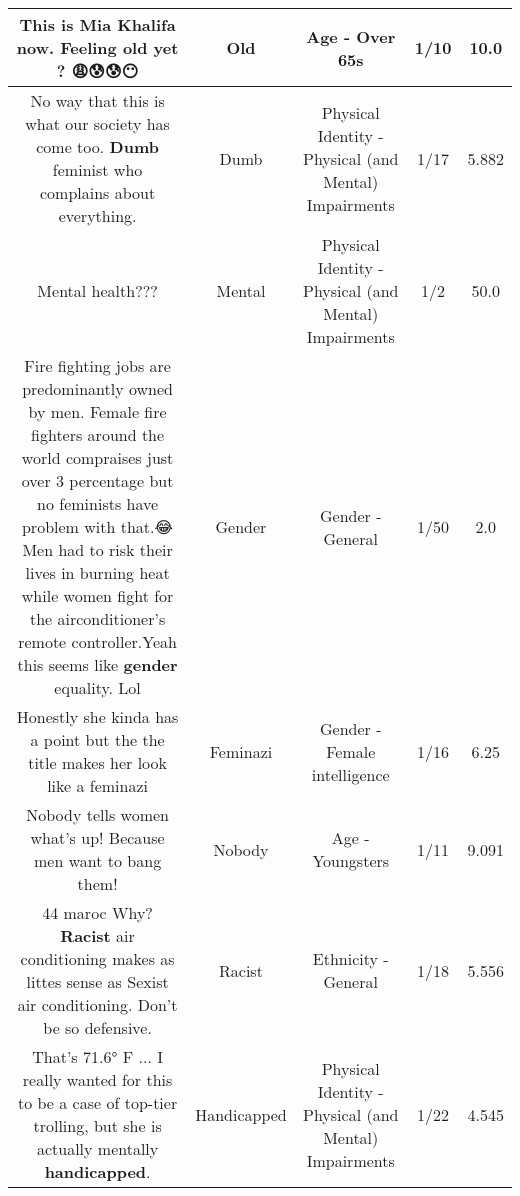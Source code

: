 \documentclass[11pt]{article}
\newlength\mylength
\begin{document}
\begin{center}
\begin{longtable}{|C{.65\mylength}|C{.30\mylength}|C{.12\mylength}|C{.12\mylength}|C{.12\mylength}|}
  \small This is Mia Khalifa now. Feeling \textbf{old} yet ? 😩😰😰😶\normalsize   & Old & Age - Over 65s & 1/10 & 10.0 \\  \hline
  \small No way that this is what our society has come too. \textbf{Dumb} feminist who complains about everything.\normalsize   & Dumb & Physical Identity - Physical (and Mental) Impairments & 1/17 & 5.882 \\  \hline
  \small Mental health???\normalsize   & Mental & Physical Identity - Physical (and Mental) Impairments & 1/2 & 50.0 \\  \hline
  \small Fire fighting jobs are predominantly owned by men. Female fire fighters around the world compraises just over 3 percentage but no feminists have problem with that.😂Men had to risk their lives in burning heat while women fight for the airconditioner's remote controller.Yeah this seems like \textbf{gender} equality. Lol\normalsize   & Gender & Gender - General & 1/50 & 2.0 \\  \hline
  \small Honestly she kinda has a point but the the title makes her look like a feminazi\normalsize   & Feminazi & Gender - Female intelligence & 1/16 & 6.25 \\  \hline
  \small Nobody tells women what's up!  Because men want to bang them!\normalsize   & Nobody & Age - Youngsters & 1/11 & 9.091 \\  \hline
  \small \@44 maroc Why?  \textbf{Racist} air conditioning makes as littes sense as Sexist air conditioning.  Don't be so defensive.\normalsize   & Racist & Ethnicity - General & 1/18 & 5.556 \\  \hline
  \small That's 71.6° F ... I really wanted for this to be a case of top-tier trolling, but she is actually mentally \textbf{handicapped}.\normalsize   & Handicapped & Physical Identity - Physical (and Mental) Impairments & 1/22 & 4.545 \\  \hline

\end{longtable}
\end{center}
\end{document}
